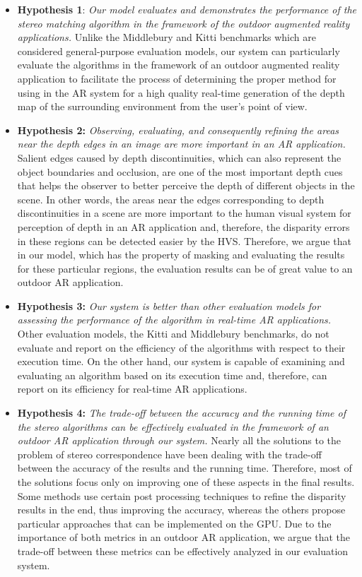 \begin{itemize}
\item \textbf{Hypothesis 1}: \emph{Our model evaluates and demonstrates 
the performance of the stereo matching algorithm in the framework of 
the outdoor augmented reality applications.} 
Unlike the Middlebury and Kitti benchmarks which are considered general-purpose evaluation models, 
our system can particularly evaluate the algorithms in the framework of an 
outdoor augmented reality application to facilitate the process of determining
the proper method for using in the AR system for a high quality real-time generation of the depth map of the surrounding environment from 
the user's point of view.

\item \textbf{Hypothesis 2:} \emph{Observing, evaluating, and consequently 
refining the areas near the depth edges in an image are more important in an AR application.}
Salient edges caused by depth discontinuities, 
which can also represent the object boundaries and occlusion, are one of the 
most important depth cues that helps the observer to better perceive the depth of different objects in the scene. In other words, the areas near the edges corresponding to depth discontinuities
in a scene are more important to the human visual system for perception of depth in an AR application and, therefore, the disparity 
errors in these regions can be detected easier by the HVS. Therefore, we argue that in our model, which has the property of masking and evaluating the results for
these particular regions,
the evaluation results can be of great value to an outdoor AR application.

\item \textbf{Hypothesis 3:} \emph{Our system is better than other evaluation models for assessing the performance of the algorithm in
real-time AR applications.}
Other evaluation models, the Kitti and Middlebury benchmarks, do not evaluate and report on the efficiency of the algorithms
with respect to their execution time. On the other hand, our system is capable of examining and evaluating an algorithm 
based on its execution time and, therefore, can report on its efficiency for real-time AR applications.

\item \textbf{Hypothesis 4:} \emph{The trade-off between the accuracy and the running time of the stereo algorithms can be effectively evaluated 
in the framework of an outdoor AR application through our system.} 
Nearly all the solutions to the problem of stereo correspondence have been dealing with the trade-off between the accuracy of the results and the running time.
Therefore, most of the solutions focus only on improving one of these aspects in the final results. Some methods use certain post processing techniques to refine the 
disparity results in the end, thus improving the accuracy, whereas the others propose particular approaches that can be implemented on the GPU.
Due to the importance of both metrics in an outdoor AR application, we argue that the trade-off between these metrics can be effectively analyzed in our evaluation system.


\end{itemize}

